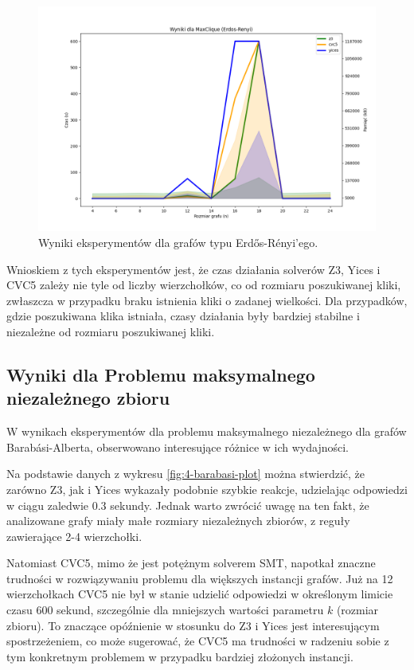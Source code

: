 \begin{figure}[htbp]
	\centering
	\begin{minipage}{\textwidth}
		\includegraphics[width=\textwidth]{./figures/3-erdos-renyi-plot.png}
		\caption{Wyniki eksperymentów dla grafów typu Erdős-Rényi'ego.}
		\label{fig:3-erdos-renyi-plot}
	\end{minipage}
\end{figure}

Wnioskiem z tych eksperymentów jest, że czas działania solverów Z3, Yices i CVC5 zależy nie tyle od liczby wierzchołków, co od rozmiaru poszukiwanej kliki, zwłaszcza w przypadku braku istnienia kliki o zadanej wielkości. Dla przypadków, gdzie poszukiwana klika istniała, czasy działania były bardziej stabilne i niezależne od rozmiaru poszukiwanej kliki.


\subsection{Wyniki dla Problemu maksymalnego niezależnego zbioru}

W wynikach eksperymentów dla problemu maksymalnego niezależnego dla grafów Barabási-Alberta, obserwowano interesujące różnice w ich wydajności.

Na podstawie danych z wykresu \ref{fig:4-barabasi-plot} można stwierdzić, że zarówno Z3, jak i Yices wykazały podobnie szybkie reakcje, udzielając odpowiedzi w ciągu zaledwie 0.3 sekundy. Jednak warto zwrócić uwagę na ten fakt, że analizowane grafy miały małe rozmiary niezależnych zbiorów, z reguły zawierające 2-4 wierzchołki.

Natomiast CVC5, mimo że jest potężnym solverem SMT, napotkał znaczne trudności w rozwiązywaniu problemu dla większych instancji grafów. Już na 12 wierzchołkach CVC5 nie był w stanie udzielić odpowiedzi w określonym limicie czasu 600 sekund, szczególnie dla mniejszych wartości parametru $k$ (rozmiar zbioru). To znaczące opóźnienie w stosunku do Z3 i Yices jest interesującym spostrzeżeniem, co może sugerować, że CVC5 ma trudności w radzeniu sobie z tym konkretnym problemem w przypadku bardziej złożonych instancji.

